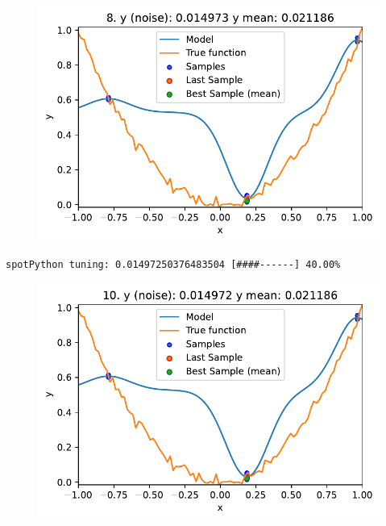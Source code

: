 \documentclass[
  letterpaper,
  DIV=11,
  numbers=noendperiod]{scrreprt}
\begin{document}
\begin{figure}[H]

{\centering \includegraphics{013_num_spot_noisy_files/figure-pdf/cell-6-output-2.pdf}

}

\end{figure}

\begin{verbatim}
spotPython tuning: 0.01497250376483504 [####------] 40.00% 
\end{verbatim}

\begin{figure}[H]

{\centering \includegraphics{013_num_spot_noisy_files/figure-pdf/cell-6-output-4.pdf}

}

\end{figure}
\end{document}
